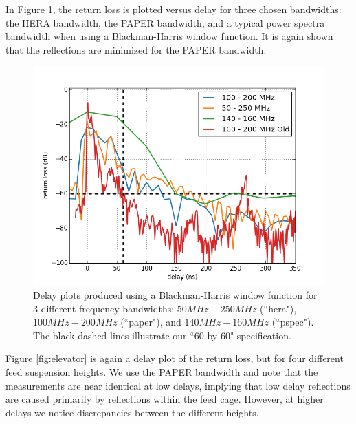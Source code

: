 \documentclass[12pt,preprint]{aastex}
\begin{document}
In Figure \ref{fig:3bands}, the return loss is plotted versus delay for three
chosen bandwidths: the HERA bandwidth, the PAPER bandwidth, and a typical power
spectra bandwidth when using a Blackman-Harris window function. It is again
shown that the reflections are minimized for the PAPER bandwidth. 

\begin{figure}
\centering
\includegraphics[totalheight=0.4\textheight]{plots/delay3_window.png}
\caption{Delay plots produced using a Blackman-Harris window function for 3 different frequency bandwidths: $50MHz-250MHz$ (``hera"), $100MHz-200MHz$ (``paper"), and $140MHz-160MHz$ (``pspec"). The black dashed lines illustrate our ``60 by 60" specification.}
\label{fig:3bands}
\end{figure}

Figure \ref{fig:elevator} is again a delay plot of the return loss, but for
four different feed suspension heights. We use the PAPER bandwidth and note
that the measurements are near identical at low delays, implying that low delay
reflections are caused primarily by reflections within the feed cage. However,
at higher delays we notice discrepancies between the different heights.
\end{document}
